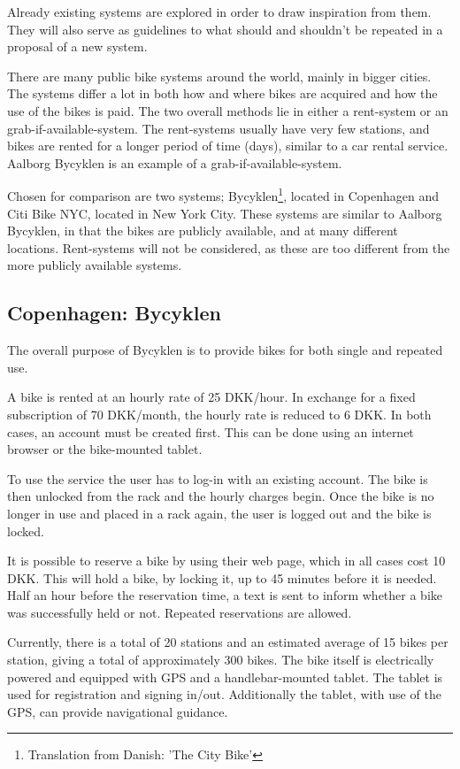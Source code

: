 Already existing systems are explored in order to draw inspiration from them.
They will also serve as guidelines to what should and shouldn't be repeated in a proposal of a new system.

There are many public bike systems around the world, mainly in bigger cities.
The systems differ a lot in both how and where bikes are acquired and how the use of the bikes is paid.
The two overall methods lie in either a rent-system or an grab-if-available-system.
The rent-systems usually have very few stations, and bikes are rented for a longer period of time (days), similar to a car rental service.
Aalborg Bycyklen is an example of a grab-if-available-system.

Chosen for comparison are two systems; Bycyklen\footnote{Translation from Danish: 'The City Bike'}, located in Copenhagen and Citi Bike NYC, located in New York City.
These systems are similar to Aalborg Bycyklen, in that the bikes are publicly available, and at many different locations.
Rent-systems will not be considered, as these are too different from the more publicly available systems.

\subsection{Copenhagen: Bycyklen}
The overall purpose of Bycyklen\cite{cph_bycyklen}\cite{cph_bycyklen_conditions} is to provide bikes for both single and repeated use.

A bike is rented at an hourly rate of 25 DKK/hour.
In exchange for a fixed subscription of 70 DKK/month, the hourly rate is reduced to 6 DKK.
In both cases, an account must be created first.
This can be done using an internet browser or the bike-mounted tablet.

To use the service the user has to log-in with an existing account.
The bike is then unlocked from the rack and the hourly charges begin.
Once the bike is no longer in use and placed in a rack again, the user is logged out and the bike is locked.

It is possible to reserve a bike by using their web page, which in all cases cost 10 DKK.
This will hold a bike, by locking it, up to 45 minutes before it is needed.
Half an hour before the reservation time, a text is sent to inform whether a bike was successfully held or not.
Repeated reservations are allowed.

Currently, there is a total of 20 stations and an estimated average of 15 bikes per station, giving a total of approximately 300 bikes.
The bike itself is electrically powered and equipped with GPS and a handlebar-mounted tablet.
The tablet is used for registration and signing in/out.
Additionally the tablet, with use of the GPS, can provide navigational guidance.

